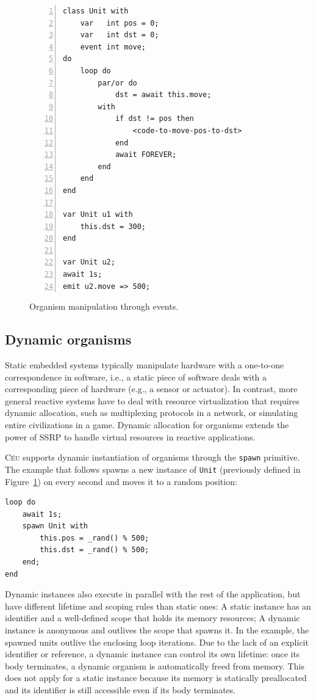 \documentclass{sigplanconf}
\newcommand{\CEU}{\textsc{C\'{e}u}\xspace}
\newcommand{\code}[1] {{\small{\texttt{#1}}}}
\newcommand{\1}{\;}
\newcommand{\2}{\;\;}
\newcommand{\3}{\;\;\;}
\newcommand{\5}{\;\;\;\;\;}
\begin{document}
\begin{figure}%
\begin{lstlisting}[numbers=left,xleftmargin=3em]
class Unit with
    var   int pos = 0;
    var   int dst = 0;
    event int move;
do
    loop do
        par/or do
            dst = await this.move;
        with
            if dst != pos then
                <code-to-move-pos-to-dst>
            end
            await FOREVER;
        end
    end
end

var Unit u1 with
    this.dst = 300;
end

var Unit u2;
await 1s;
emit u2.move => 500;
\end{lstlisting}
\caption{ Organism manipulation through events.
\label{lst.unit}
}
\end{figure}

\subsection{Dynamic organisms}
\label{sec.orgs.dyn}

Static embedded systems typically manipulate hardware with a one-to-one 
correspondence in software, i.e., a static piece of software deals with a 
corresponding piece of hardware (e.g., a sensor or actuator).
%
In contrast, more general reactive systems have to deal with resource 
virtualization that requires dynamic allocation, such as multiplexing protocols 
in a network, or simulating entire civilizations in a game.
%
Dynamic allocation for organisms extends the power of SSRP to handle virtual 
resources in reactive applications.

\CEU supports dynamic instantiation of organisms through the \code{spawn} 
primitive.
The example that follows spawns a new instance of \code{Unit} (previously 
defined in Figure~\ref{lst.unit}) on every second and moves it to a random 
position:

\begin{lstlisting}
loop do
    await 1s;
    spawn Unit with
        this.pos = _rand() % 500;
        this.dst = _rand() % 500;
    end;
end
\end{lstlisting}


Dynamic instances also execute in parallel with the rest of the application, 
but have different lifetime and scoping rules than static ones:
%
A static instance has an identifier and a well-defined scope that holds its 
memory resources;
A dynamic instance is anonymous and outlives the scope that spawns it.
In the example, the spawned units outlive the enclosing loop iterations.
%
Due to the lack of an explicit identifier or reference, a dynamic instance can 
control its own lifetime:
once its body terminates, a dynamic organism is automatically freed from 
memory.
%
This does not apply for a static instance because its memory is statically 
preallocated and its identifier is still accessible even if its body 
terminates.
\end{document}
